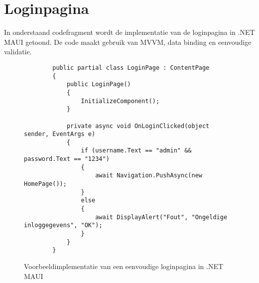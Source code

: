 

\section{Loginpagina}

In onderstaand codefragment wordt de implementatie van de loginpagina in .NET MAUI getoond. De code maakt gebruik van MVVM, data binding en eenvoudige validatie.

\begin{figure}[H]
	\centering
	\begin{verbatim}
		public partial class LoginPage : ContentPage
		{
			public LoginPage()
			{
				InitializeComponent();
			}
			
			private async void OnLoginClicked(object sender, EventArgs e)
			{
				if (username.Text == "admin" && password.Text == "1234")
				{
					await Navigation.PushAsync(new HomePage());
				}
				else
				{
					await DisplayAlert("Fout", "Ongeldige inloggegevens", "OK");
				}
			}
		}
	\end{verbatim}
	\caption{Voorbeeldimplementatie van een eenvoudige loginpagina in .NET MAUI}
\end{figure}
